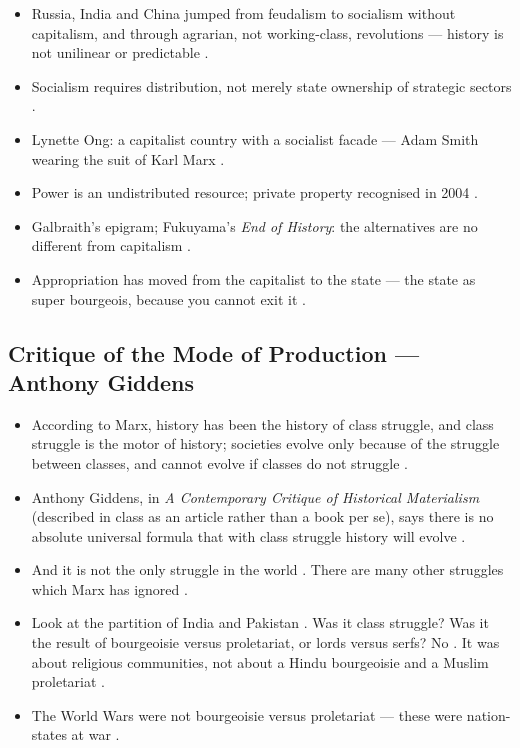 \begin{QuickRevision}
\begin{itemize}
    \item Russia, India and China jumped from feudalism to socialism without capitalism, and through agrarian, not working-class, revolutions --- history is not unilinear or predictable .
    \item Socialism requires distribution, not merely state ownership of strategic sectors .
    \item Lynette Ong: a capitalist country with a socialist facade --- Adam Smith wearing the suit of Karl Marx .
    \item Power is an undistributed resource; private property recognised in 2004 .
    \item Galbraith's epigram; Fukuyama's \emph{End of History}: the alternatives are no different from capitalism .
    \item Appropriation has moved from the capitalist to the state --- the state as super bourgeois, because you cannot exit it .
\end{itemize}
\end{QuickRevision}

\subsection{Critique of the Mode of Production --- Anthony Giddens}
\begin{itemize}
    \item According to Marx, history has been the history of class struggle, and class struggle is the motor of history; societies evolve only because of the struggle between classes, and cannot evolve if classes do not struggle .
    \item Anthony Giddens, in \emph{A Contemporary Critique of Historical Materialism} (described in class as an article rather than a book per se), says there is no absolute universal formula that with class struggle history will evolve .
    \item And it is not the only struggle in the world . There are many other struggles which Marx has ignored .
\end{itemize}

\begin{ExampleBox}
\begin{itemize}
    \item Look at the partition of India and Pakistan . Was it class struggle? Was it the result of bourgeoisie versus proletariat, or lords versus serfs? No . It was about religious communities, not about a Hindu bourgeoisie and a Muslim proletariat .
    \item The World Wars were not bourgeoisie versus proletariat --- these were nation-states at war .
\end{itemize}
\end{ExampleBox}

